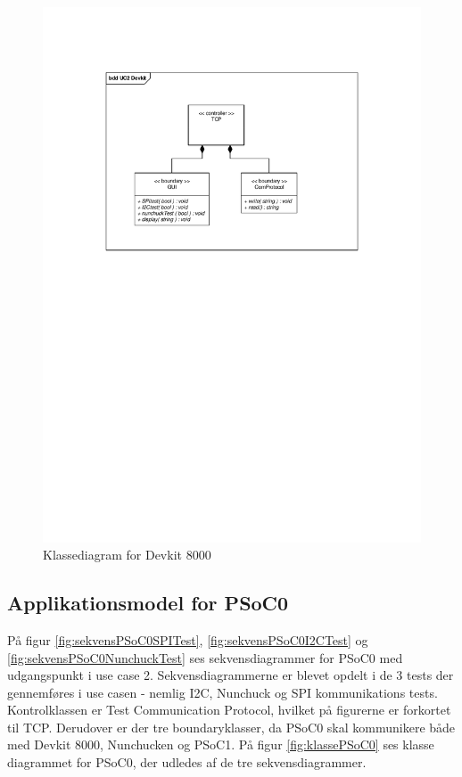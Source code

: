 \begin{figure}[H]
	\centering
	\includegraphics[trim = {3.2cm 16.1cm 3.2cm 3.5cm}, clip = true, width=\textwidth] {Systemarkitektur/images/klassediagramDevkit.pdf}
	\caption{Klassediagram for Devkit 8000}
	\label{fig:klasseDevkit}
\end{figure}

\subsection{Applikationsmodel for PSoC0}
På figur \ref{fig:sekvensPSoC0SPITest}, \ref{fig:sekvensPSoC0I2CTest} og \ref{fig:sekvensPSoC0NunchuckTest} ses sekvensdiagrammer for PSoC0 med udgangspunkt i use case 2. Sekvensdiagrammerne er blevet opdelt i de 3 tests der gennemføres i use casen - nemlig I2C, Nunchuck og SPI kommunikations tests. Kontrolklassen er Test Communication Protocol, hvilket på figurerne er forkortet til TCP. Derudover er der tre boundaryklasser, da PSoC0 skal kommunikere både med Devkit 8000, Nunchucken og PSoC1. På figur \ref{fig:klassePSoC0} ses klasse diagrammet for PSoC0, der udledes af de tre sekvensdiagrammer.

